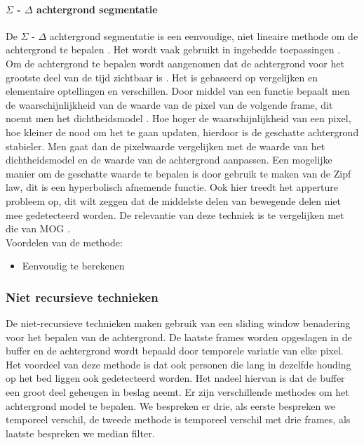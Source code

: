 \paragraph{ $\Sigma$ - $\Delta$ achtergrond segmentatie}
De $\Sigma$ - $\Delta$ achtergrond segmentatie is een eenvoudige, niet lineaire methode om de achtergrond te bepalen \cite{bibSDB}. Het wordt vaak gebruikt in ingebedde toepassingen \cite{bibBET8}. Om de achtergrond te bepalen wordt aangenomen dat de achtergrond voor het grootste deel van de tijd zichtbaar is \cite{bibSDB2}. Het is gebaseerd op vergelijken en elementaire optellingen en verschillen. 
Door middel van een functie bepaalt men de waarschijnlijkheid van de waarde van de pixel van de volgende frame, dit noemt men het dichtheidsmodel .  Hoe hoger de waarschijnlijkheid van een pixel, hoe kleiner de nood om het te gaan updaten, hierdoor is de geschatte achtergrond stabieler. \cite{bibSDB2} Men gaat dan de pixelwaarde vergelijken met de waarde van het dichtheidsmodel en de waarde van de achtergrond aanpassen. Een mogelijke manier om de geschatte waarde te bepalen is door gebruik te maken van de Zipf law, dit is een hyperbolisch afnemende functie. Ook hier treedt het apperture probleem op, dit wilt zeggen dat de middelste delen van bewegende delen niet mee gedetecteerd worden. De relevantie van deze techniek is te vergelijken met die van MOG \cite{bibSDB}.\\
Voordelen van de methode:
\begin{itemize}
	\item Eenvoudig te berekenen
\end{itemize}


\subsubsection{Niet recursieve technieken}
\label{refNRT}
De niet-recursieve technieken maken gebruik van een sliding window benadering voor het bepalen van de achtergrond. De laatste frames worden opgeslagen in de buffer en de achtergrond wordt bepaald door temporele variatie van elke pixel. Het voordeel van deze methode is dat ook personen die lang in dezelfde houding op het bed liggen ook gedetecteerd worden. Het nadeel hiervan is dat de buffer een groot deel geheugen in beslag neemt. Er zijn verschillende methodes om het achtergrond model te bepalen. We bespreken er drie, als eerste bespreken we temporeel verschil, de tweede methode is temporeel verschil met drie frames, als laatste bespreken we median filter.

